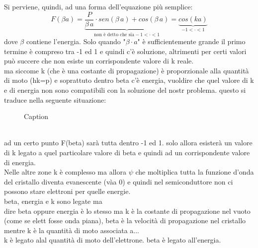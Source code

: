 Si perviene, quindi, ad una forma dell'equazione più semplice:
\begin{equation}
    F(\beta a)=\underbrace{\dfrac{P}{\beta \, a}\cdot sen(\beta \,a)+cos(\beta \,a)}_{\text{non è detto che sia} -1<\cdot<1} = \underbrace{cos(ka)}_{-1<\cdot<1}
\end{equation}
dove $\beta$ contiene l'energia.
Solo quando "$\beta \cdot a$" è sufficientemente grande il primo termine è compreso tra -1 ed 1 e quindi c'è soluzione, altrimenti per certi valori può succere che non esiste un corrispondente valore di k reale.\\
 ma siccome k (che è una costante di propagazione) è proporzionale alla quantità di moto (hk=p)
e soprattuto dentro beta c'è energia, vuoldire che quel valore di k e di energia non sono compatibili con la soluzione del nostr problema.
questo si traduce nella seguente situazione:
%
\begin{figure}[hbt!]
    \centering
    \caption{Caption}%
    \label{fig:enter_label}
\end{figure}
\\%
ad un certo punto F(beta) sarà tutta dentro -1 ed 1.
solo allora esisterà un valore di k legato a quel particolare valore di beta e quindi ad un corrispondente valore di energia.\\
Nelle altre zone k è complesso ma allora $\psi$ che moltiplica tutta la funzione d'onda del cristallo diventa evanescente (vàa  0) e quindi nel semiconduttore non ci possono stare elettroni per quelle energie.\\
beta, energia e k sono legate ma \\
dire beta oppure energia è lo stesso ma k è la costante di propagazione nel vuoto (come se elett fosse onda piana), beta è la velocità di propagazione nel cristallo mentre k è la quantità di moto associata a...\\
k è legato alal quantità di moto dell'elettrone.
beta è legato all'energia.

